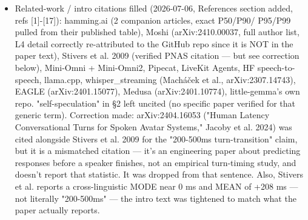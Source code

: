 \documentclass[journal]{IEEEtran}
\begin{document}
\begin{itemize}
    \item[$\blacksquare$] Related-work / intro citations filled (2026-07-06, References section added, refs [1]-[17]): hamming.ai (2 companion articles, exact P50/P90/ P95/P99 pulled from their published table), Moshi (arXiv:2410.00037, full author list, L4 detail correctly re-attributed to the GitHub repo since it is NOT in the paper text), Stivers et al. 2009 (verified PNAS citation — but see correction below), Mini-Omni + Mini-Omni2, Pipecat, LiveKit Agents, HF speech-to-speech, llama.cpp, whisper\_streaming (Macháček et al., arXiv:2307.14743), EAGLE (arXiv:2401.15077), Medusa (arXiv:2401.10774), little-gemma's own repo. "self-speculation" in §2 left uncited (no specific paper verified for that generic term). Correction made: arXiv:2404.16053 ("Human Latency Conversational Turns for Spoken Avatar Systems," Jacoby et al. 2024) was cited alongside Stivers et al. 2009 for the "200-500ms turn-transition" claim, but it is a mismatched citation — it's an engineering paper about predicting responses before a speaker finishes, not an empirical turn-timing study, and doesn't report that statistic. It was dropped from that sentence. Also, Stivers et al. reports a cross-linguistic MODE near 0 ms and MEAN of +208 ms — not literally "200-500ms" — the intro text was tightened to match what the paper actually reports.
\end{itemize}


\ifCLASSOPTIONcaptionsoff
  \newpage
\fi




\end{document}
